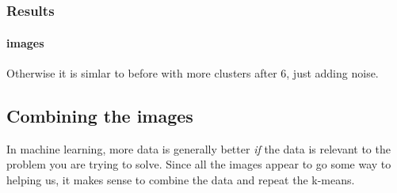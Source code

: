 \documentclass[11pt]{article}
\begin{document}
    \begin{center}
    \end{center}
    { \hspace*{\fill} \\}
    
    \begin{center}
    \end{center}
    { \hspace*{\fill} \\}
    
    \begin{center}
    \end{center}
    { \hspace*{\fill} \\}
    
    \begin{center}
    \end{center}
    { \hspace*{\fill} \\}
    
    \subsubsection{Results}\label{results}

\paragraph{images}\label{images}

Otherwise it is simlar to before with more clusters after 6, just adding
noise.

    \subsection{Combining the images}\label{combining-the-images}

In machine learning, more data is generally better \emph{if} the data is
relevant to the problem you are trying to solve. Since all the images
appear to go some way to helping us, it makes sense to combine the data
and repeat the k-means.
\end{document}
